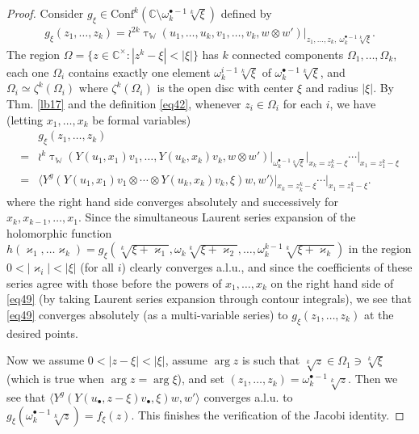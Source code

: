 \documentclass[12pt,a4paper,notitlepage]{article}
\theoremstyle{definition}
\theoremstyle{plain}
\newcommand{\Conf}{\mathrm{Conf}}
\newcommand{\bk}[1]{\langle {#1}\rangle}
\newcommand{\blt}{\bullet}
\newcommand{\Wbb}{\mathbb W}
\newcommand{\Cbb}{\mathbb C}
\numberwithin{equation}{section}
\begin{document}
\begin{proof}
Consider $g_\xi\in\Conf^k(\Cbb\setminus\omega_k^{\blt-1}\sqrt[k]{\xi})$ defined by
\begin{align*}
g_\xi(z_1,\dots,z_k)=\wr^{2k}\uptau_\Wbb(u_1,\dots,u_k,v_1,\dots,v_k,w\otimes w')\Big|_{z_1,\dots,z_k,~\omega_k^{\blt-1}\sqrt[k]{\xi}}.	
\end{align*}
The region $\Omega=\{z\in\Cbb^\times:|z^k-\xi|<|\xi|\}$ has $k$ connected components $\Omega_1,\dots,\Omega_k$, each one $\Omega_i$ contains exactly one element $\omega_k^{i-1}\sqrt[k]{\xi}$ of $\omega_k^{\blt-1}\sqrt[k]{\xi}$, and $\Omega_i\simeq\zeta^k(\Omega_i)$ where $\zeta^k(\Omega_i)$ is the open disc with center $\xi$ and radius $|\xi|$. By Thm. \ref{lb17} and the definition \eqref{eq42}, whenever $z_i\in\Omega_i$ for each $i$, we have  (letting $x_1,\dots,x_k$ be formal variables)
\begin{align}
&g_\xi(z_1,\dots,z_k)\nonumber\\
=&\wr^k\uptau_\Wbb(Y(u_1,x_1)v_1,\dots,Y(u_k,x_k)v_k,w\otimes w')\Big|_{\omega_k^{\blt-1}\sqrt[k]{\xi}}\Big|_{x_k=z_k^k-\xi}\cdots \Big|_{x_1=z_1^k-\xi}\nonumber\\
=&\bk{Y^g(Y(u_1,x_1)v_1\otimes\cdots\otimes Y(u_k,x_k)v_k,\xi)w,w'}\Big|_{x_k=z_k^k-\xi}\cdots \Big|_{x_1=z_1^k-\xi}.\label{eq49}
\end{align}
where the right hand side converges absolutely and successively for $x_k,x_{k-1},\dots,x_1$. Since the simultaneous Laurent series expansion of the holomorphic function $h(\varkappa_1,\dots\varkappa_k)=g_\xi(\sqrt[k]{\xi+\varkappa_1},\omega_k\sqrt[k]{\xi+\varkappa_2},\dots,\omega_k^{k-1} \sqrt[k]{\xi+\varkappa_k})$ in the region $0<|\varkappa_i|<|\xi|$ (for all $i$) clearly converges a.l.u., and since the coefficients of these series agree with those before the powers of $x_1,\dots,x_k$ on the right hand side of \eqref{eq49} (by taking Laurent series expansion through contour integrals), we see that \eqref{eq49} converges absolutely (as a multi-variable series) to $g_\xi(z_1,\dots,z_k)$  at the desired points. 

Now we  assume $0<|z-\xi|<|\xi|$, assume  $\arg z$ is such that $\sqrt[k]{z}\in\Omega_1\ni\sqrt[k]{\xi}$ (which is true when $\arg z=\arg \xi$), and  set $(z_1,\dots,z_k)=\omega_k^{\blt-1}\sqrt[k]{z}$. Then we see that $\bk{Y^g(Y(u_\blt,z-\xi)v_\blt,\xi)w,w'}$ converges a.l.u. to $g_\xi(\omega_k^{\blt-1}\sqrt[k]{z})=f_\xi(z)$. This finishes the verification of the Jacobi identity.
\end{proof}
\end{document}
